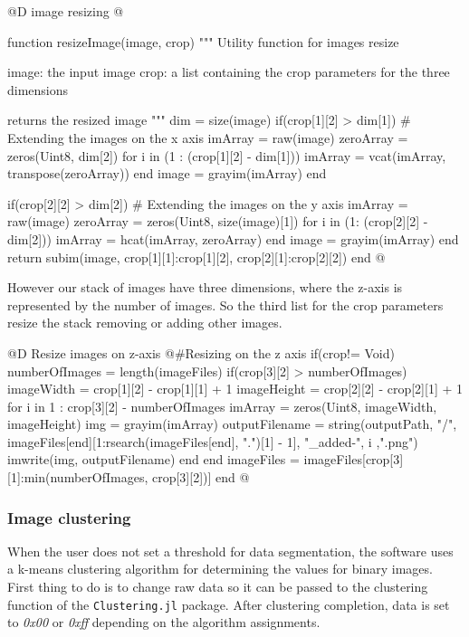 \documentclass[11pt,oneside]{article}	%
\begin{document}
@D image resizing
@{function resizeImage(image, crop)
  """
  Utility function for images resize
  
  image: the input image
  crop: a list containing the crop parameters 
        for the three dimensions 
  
  returns the resized image
  """
  dim = size(image)
  if(crop[1][2] > dim[1])
    # Extending the images on the x axis
    imArray = raw(image)
    zeroArray = zeros(Uint8, dim[2])
    for i in (1 : (crop[1][2] - dim[1]))
      imArray = vcat(imArray, transpose(zeroArray))
    end
    image = grayim(imArray)
  end
  
  if(crop[2][2] > dim[2])
    # Extending the images on the y axis
    imArray = raw(image)
    zeroArray = zeros(Uint8, size(image)[1])
    for i in (1: (crop[2][2] - dim[2]))
      imArray = hcat(imArray, zeroArray)
    end
    image = grayim(imArray)
  end
  return subim(image, crop[1][1]:crop[1][2], crop[2][1]:crop[2][2])
end @}

However our stack of images have three dimensions, where the z-axis is represented by the number of images. So the third list for the crop parameters resize the stack removing or adding other images.

@D Resize images on z-axis
@{#Resizing on the z axis
if(crop!= Void)
  numberOfImages = length(imageFiles)
  if(crop[3][2] > numberOfImages)
    imageWidth = crop[1][2] - crop[1][1] + 1
    imageHeight = crop[2][2] - crop[2][1] + 1
    for i in 1 : crop[3][2] - numberOfImages
      imArray = zeros(Uint8, imageWidth, imageHeight)
      img = grayim(imArray)
      outputFilename = string(outputPath, "/", imageFiles[end][1:rsearch(imageFiles[end], ".")[1] - 1],
                              "_added-", i ,".png")
      imwrite(img, outputFilename)
    end 
  end
  imageFiles = imageFiles[crop[3][1]:min(numberOfImages, crop[3][2])]
end @}

\subsubsection{Image clustering}\label{sec:imageClustering}

When the user does not set a threshold for data segmentation, the software uses a k-means clustering algorithm for determining the values for binary images. First thing to do is to change raw data so it can be passed to the clustering function of the \texttt{Clustering.jl} package. After clustering completion, data is set to \textit{0x00} or \textit{0xff} depending on the algorithm assignments.
\end{document}

